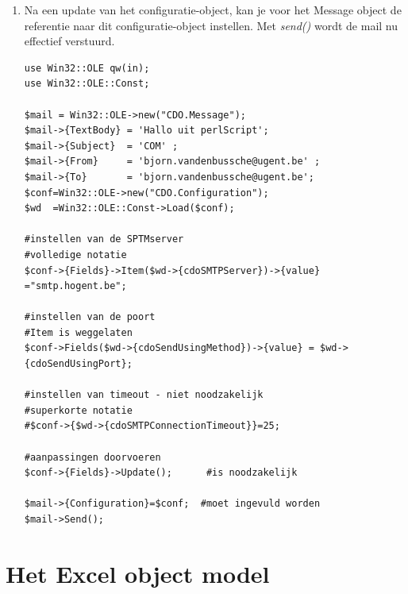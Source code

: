 \documentclass[11pt,a4paper]{report}
\begin{document}
\begin{enumerate}[resume]
\begin{lstlisting}
foreach (in $conf->{Fields}){
	print "\n\nName  : ",$_->{Name};
	print "\n\tValue : ",$_->{Value};
}
\end{lstlisting}
	\item Na een update van het configuratie-object, kan je voor het Message object de referentie naar dit configuratie-object instellen. Met \textit{send()} wordt de mail nu effectief verstuurd.
\begin{lstlisting}
use Win32::OLE qw(in);
use Win32::OLE::Const;

$mail = Win32::OLE->new("CDO.Message");
$mail->{TextBody} = 'Hallo uit perlScript';
$mail->{Subject}  = 'COM' ;
$mail->{From}     = 'bjorn.vandenbussche@ugent.be' ;
$mail->{To}       = 'bjorn.vandenbussche@ugent.be';
$conf=Win32::OLE->new("CDO.Configuration");
$wd  =Win32::OLE::Const->Load($conf);

#instellen van de SPTMserver
#volledige notatie
$conf->{Fields}->Item($wd->{cdoSMTPServer})->{value} ="smtp.hogent.be"; 

#instellen van de poort 
#Item is weggelaten
$conf->Fields($wd->{cdoSendUsingMethod})->{value} = $wd->{cdoSendUsingPort};

#instellen van timeout - niet noodzakelijk
#superkorte notatie 
#$conf->{$wd->{cdoSMTPConnectionTimeout}}=25;

#aanpassingen doorvoeren
$conf->{Fields}->Update();      #is noodzakelijk

$mail->{Configuration}=$conf;  #moet ingevuld worden
$mail->Send();
\end{lstlisting}
\end{enumerate}
\chapter{Het Excel object model}
\end{document}

